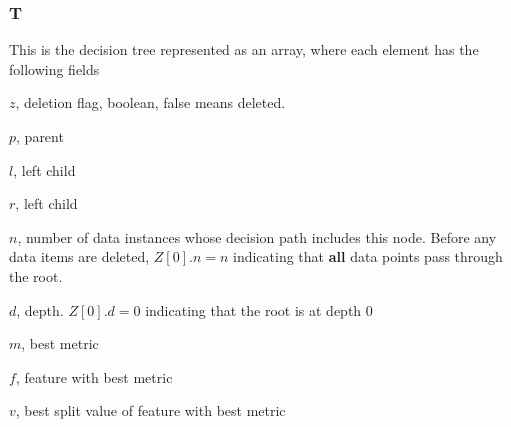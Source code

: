 \documentclass[12pt,letterpaper]{article}
\begin{document}
\begin{figure}
\centering
{}
\end{figure}

\subsubsection{T}
This is the decision tree represented as an array, where each element has the
following fields 
  \be
\item \(z\), deletion flag, boolean, false means deleted.
\item \(p\), parent
\item \(l\), left child 
\item \(r\), left child 
\item \(n\), number of data instances whose decision path includes this node.
  Before any data items  are deleted, \(Z[0].n = n\) indicating that {\bf all}
  data points pass through the root.
\item \(d\), depth. \(Z[0].d = 0\) indicating that the root is at depth 0 
\item \(m\), best metric 
\item \(f\), feature with best metric 
\item \(v\), best split value of feature with best metric 
  \ee
\end{document}
